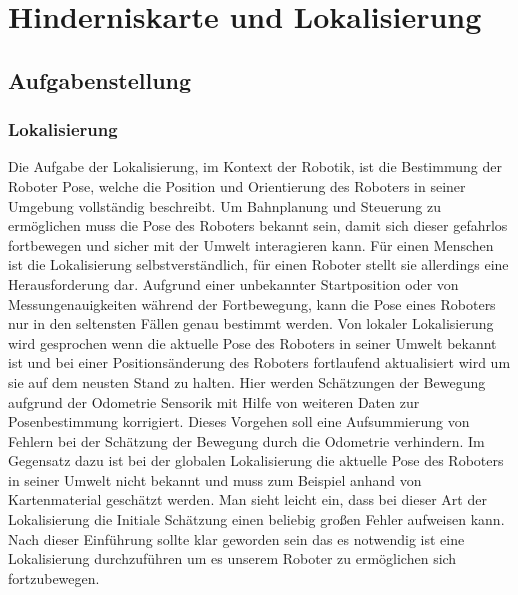 \chapter{Hinderniskarte und Lokalisierung}
\label{lokalisierung_cha}
\section{Aufgabenstellung}
\label{lokalisierung_aufgabenstellung_sec}
\authorsection{\editorandreas}
\subsection{Lokalisierung}
Die Aufgabe der Lokalisierung, im Kontext der Robotik, ist die Bestimmung der
Roboter Pose, welche die Position und Orientierung des Roboters in seiner Umgebung vollständig beschreibt.
 Um Bahnplanung und Steuerung zu ermöglichen muss die Pose des Roboters bekannt sein,
 damit sich dieser gefahrlos fortbewegen und sicher mit der Umwelt interagieren kann.
 Für einen Menschen ist die Lokalisierung selbstverständlich, für einen Roboter
 stellt sie allerdings eine Herausforderung dar.
 Aufgrund einer unbekannter Startposition oder von Messungenauigkeiten während
 der Fortbewegung, kann die Pose eines Roboters nur in den seltensten Fällen
 genau bestimmt werden.
  Von lokaler Lokalisierung wird gesprochen wenn die aktuelle Pose des Roboters
 in seiner Umwelt bekannt ist und bei einer Positionsänderung des Roboters
 fortlaufend aktualisiert wird um sie auf dem neusten Stand zu halten. Hier
 werden Schätzungen der Bewegung aufgrund der Odometrie Sensorik mit Hilfe von weiteren Daten zur Posenbestimmung korrigiert. Dieses Vorgehen soll eine Aufsummierung von Fehlern bei der
 Schätzung der Bewegung durch die Odometrie verhindern. Im Gegensatz dazu ist
 bei der globalen Lokalisierung die aktuelle Pose des Roboters in seiner Umwelt
 nicht bekannt und muss zum Beispiel anhand von Kartenmaterial geschätzt werden.
 Man sieht leicht ein, dass bei dieser Art der Lokalisierung die Initiale
 Schätzung einen beliebig großen Fehler aufweisen kann.
 Nach dieser Einführung sollte klar geworden sein das es notwendig
 ist eine Lokalisierung durchzuführen um es unserem Roboter zu
 ermöglichen sich fortzubewegen.
